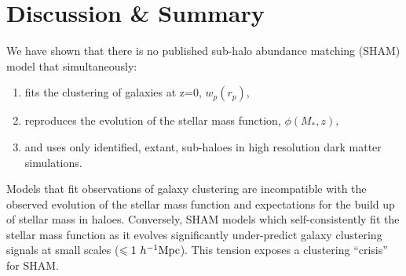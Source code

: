 \documentclass[a4paper,fleqn,usenatbib]{mnras}
\begin{document}








\section{Discussion \& Summary}

We have shown that there is no published sub-halo abundance matching (SHAM) model that simultaneously:
\begin{enumerate}
\item fits the clustering of galaxies at z=0, $w_p(r_p)$,
\item reproduces the evolution of the stellar mass function, $\phi(M_*,z)$,
\item and uses only identified, extant, sub-haloes in high resolution dark matter simulations.
\end{enumerate}
Models that fit observations of galaxy clustering are incompatible with the observed evolution of the stellar mass function and expectations for the build up of stellar mass in haloes.  Conversely, SHAM models which self-consistently fit the stellar mass function as it evolves significantly under-predict galaxy clustering signals at small scales ($\leq 1~h^{-1}{\rm Mpc}$).  This tension exposes a clustering ``crisis'' for SHAM.   
\end{document}
